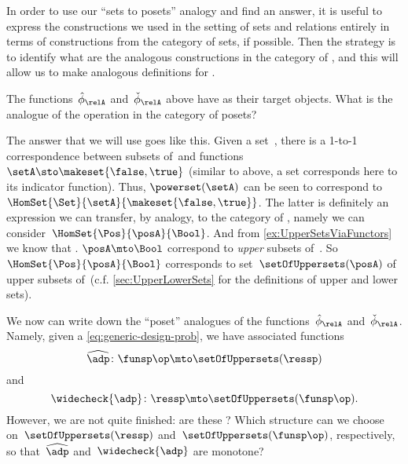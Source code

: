 In order to use our ``sets to posets'' analogy and find an answer, it is useful to express the constructions we used in the setting of sets and relations entirely in terms of constructions from the category of sets, if possible.
Then the strategy is to identify what are the analogous constructions in the category of , and this will allow us to make analogous definitions for .

The functions~$\hat \phi_{\relA}$ and~$\check \phi_{\relA}$ above have  as their target objects.
What is the analogue of the  operation in the category of posets?

The answer that we will use goes like this.
Given a set~\setA, there is a 1-to-1 correspondence between subsets of~\setA and functions~$\setA \sto \makeset{ \false, \true }$ (similar to above, a set corresponds here to its indicator function).
Thus, $\powerset (\setA)$ can be seen to correspond to~$\HomSet{\Set}{\setA}{\makeset{ \false, \true}}$.
The latter is definitely an expression we can transfer, by analogy, to the category of , namely we can consider~$\HomSet{\Pos}{\posA}{\Bool}$.
And from \cref{ex:UpperSetsViaFunctors} we know that .
$\posA \mto \Bool$ correspond to \emph{upper} subsets of~\posA.
So~$\HomSet{\Pos}{\posA}{\Bool}$ corresponds to set~$\setOfUppersets (\posA)$ of upper subsets of~\posA (c.f.
\cref{sec:UpperLowerSets} for the definitions of upper and lower sets).

We now can write down the ``poset'' analogues of the functions~$\hat \phi_{\relA}$ and~$\check \phi_{\relA}$.
Namely, given a  \cref{eq:generic-design-prob}, we have associated functions
\begin{equation}
    \label{eq:dp-left-curry}
    \widehat{\adp} \colon \funsp\op \mto \setOfUppersets (\ressp)
\end{equation}
and
\begin{equation}
    \label{eq:dp-right-curry}
    \widecheck{\adp} \colon \ressp \mto \setOfUppersets (\funsp\op).
\end{equation}
However, we are not quite finished: are these  ?
Which  structure can we choose on~$\setOfUppersets (\ressp)$ and~$\setOfUppersets (\funsp\op)$, respectively, so that~$\widehat{\adp}$ and~$\widecheck{\adp}$ are monotone?


